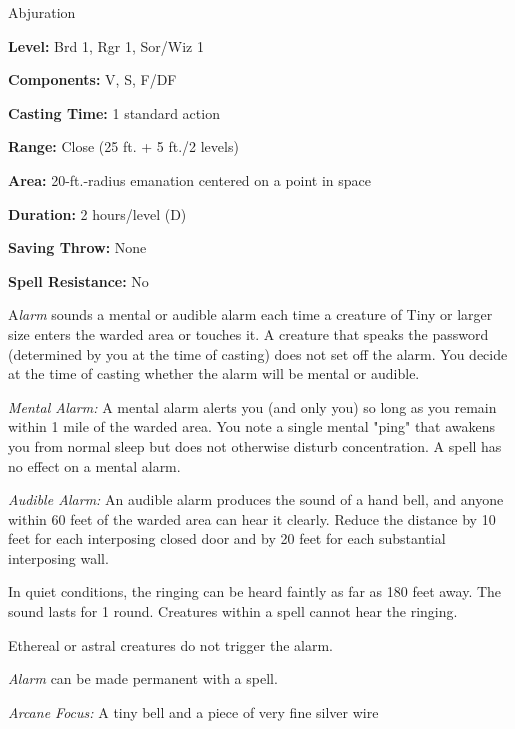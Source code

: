 
Abjuration

\textbf{Level:} Brd 1, Rgr 1, Sor/Wiz 1

\textbf{Components:} V, S, F/DF

\textbf{Casting Time:} 1 standard action

\textbf{Range:} Close (25 ft. + 5 ft./2 levels)

\textbf{Area:} 20-ft.-radius emanation centered on a point in space

\textbf{Duration:} 2 hours/level (D)

\textbf{Saving Throw:} None

\textbf{Spell Resistance:} No

A\textit{larm} sounds a mental or audible alarm each time a creature of Tiny or 
larger size enters the warded area or touches it. A creature that speaks the password 
(determined by you at the time of casting) does not set off the alarm. 
You decide at the time of casting whether the alarm will be mental or 
audible.

\textit{Mental Alarm:} A mental alarm alerts you (and only you) so long 
as you remain within 1 mile of the warded area. You note a single mental "ping" 
that awakens you from normal sleep but does not otherwise disturb concentration. 
A  spell has no effect on a mental alarm.

\textit{Audible Alarm:} An audible alarm produces the sound of a hand 
bell, and anyone within 60 feet of the warded area can hear it clearly. Reduce 
the distance by 10 feet for each interposing closed door and by 20 feet for each 
substantial interposing wall.

In quiet conditions, the ringing can be heard faintly as far as 180 feet away. 
The sound lasts for 1 round. Creatures within a  spell cannot hear 
the ringing.

Ethereal or astral creatures do not trigger the alarm.

\textit{Alarm} can be made permanent with a  spell.

\textit{Arcane Focus:} A tiny bell and a piece of very fine silver wire

